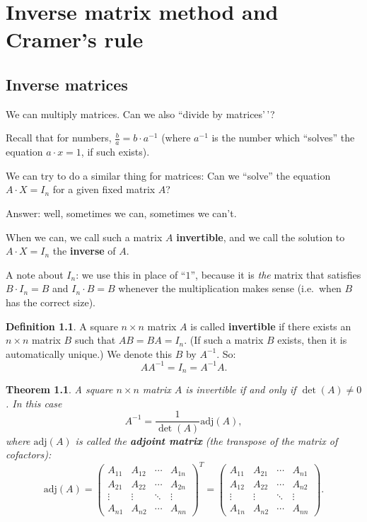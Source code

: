 \documentclass[
  12pt,
  oneside]{book}
\newtheorem{theorem}{Theorem}[chapter]
\theoremstyle{definition}
\newtheorem{definition}{Definition}[chapter]
\theoremstyle{definition}
\theoremstyle{definition}
\theoremstyle{definition}
\theoremstyle{remark}
\begin{document}
\hypertarget{inverse-matrix-method-and-cramers-rule}{%
\chapter{Inverse matrix method and Cramer's rule}\label{inverse-matrix-method-and-cramers-rule}}

\hypertarget{inverse-matrices}{%
\section{Inverse matrices}\label{inverse-matrices}}

We can multiply matrices. Can we also ``divide by matrices'\,'?

Recall that for numbers, \(\frac{b}{a} = b \cdot a^{-1}\) (where \(a^{-1}\) is the number which ``solves'' the equation \(a\cdot x = 1\), if such exists).

We can try to do a similar thing for matrices: Can we ``solve'' the equation \(A\cdot X=I_n\) for a given fixed matrix \(A\)?

Answer: well, sometimes we can, sometimes we can't.

When we can, we call such a matrix \(A\) \textbf{invertible}, and we call the solution to \(A\cdot X=I_n\) the \textbf{inverse} of \(A\).

A note about \(I_n\): we use this in place of ``\(1\)'', because it is \emph{the} matrix that satisfies \(B\cdot I_n=B\) and \(I_n\cdot B=B\) whenever the multiplication makes sense (i.e.~when \(B\) has the correct size).

\begin{definition}
A square \(n\times n\) matrix \(A\) is called \textbf{invertible} if there exists an \(n\times n\) matrix \(B\) such that \(AB=BA=I_n\). (If such a matrix \(B\) exists, then it is automatically unique.) We denote this \(B\) by \(A^{-1}\). So:
\[
AA^{-1}=I_n=A^{-1}A.
\]
\end{definition}

\begin{theorem}
A square \(n\times n\) matrix \(A\) is invertible if and only if \(\det(A)\not=0\). In this case
\[
\boxed{A^{-1} = \frac{1}{\det(A)}\mathrm{adj}(A)},
\]
where \(\mathrm{adj}(A)\) is called the \textbf{adjoint matrix} (the transpose of the matrix of cofactors):
\[
\mathrm{adj}(A) = \begin{pmatrix}
    A_{11} & A_{12} & \cdots & A_{1n}\\
    A_{21} & A_{22} & \cdots & A_{2n}\\
    \vdots & \vdots & \ddots & \vdots\\
    A_{n1} & A_{n2} & \cdots & A_{nn}
\end{pmatrix}^T = \begin{pmatrix}
    A_{11} & A_{21} & \cdots & A_{n1}\\
    A_{12} & A_{22} & \cdots & A_{n2}\\
    \vdots & \vdots & \ddots & \vdots\\
    A_{1n} & A_{n2} & \cdots & A_{nn}
\end{pmatrix}.
\]
\end{theorem}
\end{document}
